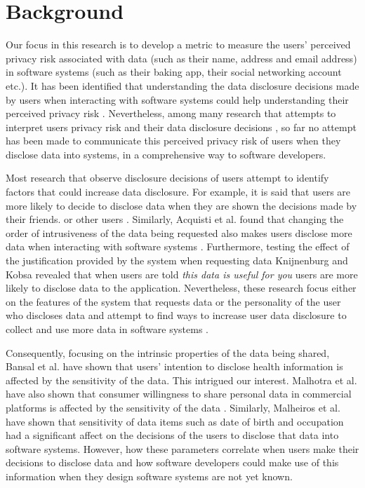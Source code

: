 \documentclass[10pt]{article}
\begin{document}
\section {Background}

Our focus in this research is to develop a metric to measure the users' perceived privacy risk associated with data (such as their name, address and email address) in software systems (such as their baking app, their social networking account etc.). It has been identified that understanding the data disclosure decisions made by users when interacting with software systems could help understanding their perceived privacy risk \cite {kobsa2007privacy, li2010understanding, malhotra2004internet}. Nevertheless, among many research that attempts to interpret users privacy risk and their data disclosure decisions \cite {knijnenburg2013making, li2010understanding, wang2016context, malheiros2013fairly, dennett2000little}, so far no attempt has been made to communicate this perceived privacy risk of users when they disclose data into systems, in a comprehensive way to software developers. 

Most research that observe disclosure decisions of users attempt to identify factors that could increase data disclosure. For example, it is said that users are more likely to decide to disclose data when they are shown the decisions made by their friends. \cite {dennett2000little} or other users \cite {besmer2010impact}. Similarly, Acquisti et al. found that changing the order of intrusiveness of the data being requested also makes users disclose more data when interacting with software systems \cite {acquisti2012impact}. Furthermore, testing the effect of the justification provided by the system when requesting data Knijnenburg and Kobsa \cite {knijnenburg2013helping} revealed that when users are told \textit{this data is useful for you} users are more likely to disclose data to the application. Nevertheless, these research focus either on the features of the system that requests data \cite {li2010understanding, wang2016context, malheiros2013fairly} or the personality of the user who discloses data \cite {nissenbaum2009privacy} and attempt to find ways to increase user data disclosure to collect and use more data in software systems \cite {dennett2000little}. 

Consequently, focusing on the intrinsic properties of the data being shared, Bansal et al. have shown that users' intention to disclose health information is affected by the sensitivity of the data\cite {bansal2010impact}. This intrigued our interest. Malhotra et al. have also shown that consumer willingness to share personal data in commercial platforms is affected by the sensitivity of the data \cite {malhotra2004internet}. Similarly, Malheiros et al. \cite {malheiros2013fairly} have shown that sensitivity of data items such as date of birth and occupation had a significant affect on the decisions of the users to disclose that data into software systems. However, how these parameters correlate when users make their decisions to disclose data and how software developers could make use of this information when they design software systems are not yet known.
\end{document}
